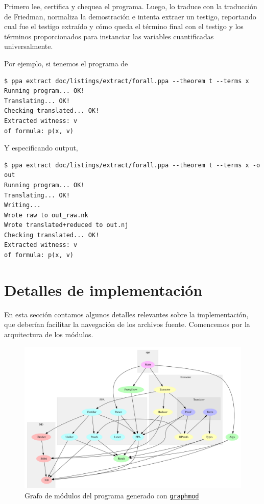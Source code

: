 Primero lee, certifica y chequea el programa. Luego, lo traduce con la
traducción de Friedman, normaliza la demostración e intenta extraer un testigo,
reportando cual fue el testigo extraído y cómo queda el término final con el
testigo y los términos proporcionados para instanciar las variables
cuantificadas universalmente.

Por ejemplo, si tenemos el programa de 

\begin{verbatim}
$ ppa extract doc/listings/extract/forall.ppa --theorem t --terms x
Running program... OK!
Translating... OK!
Checking translated... OK!
Extracted witness: v
of formula: p(x, v)
\end{verbatim}

Y especificando output,

\begin{verbatim}
$ ppa extract doc/listings/extract/forall.ppa --theorem t --terms x -o out
Running program... OK!
Translating... OK!
Writing...
Wrote raw to out_raw.nk
Wrote translated+reduced to out.nj
Checking translated... OK!
Extracted witness: v
of formula: p(x, v) 
\end{verbatim}

\section{Detalles de implementación}

En esta sección contamos algunos detalles relevantes sobre la implementación,
que deberían facilitar la navegación de los archivos fuente.
Comencemos por la arquitectura de los módulos.

\begin{figure}[h]
    \centering
    \includegraphics[scale=0.38]{img/modules.png}
    \caption{Grafo de módulos del programa \ppaTool{} generado con \href{https://github.com/yav/graphmod}{\texttt{graphmod}}}
\end{figure}

